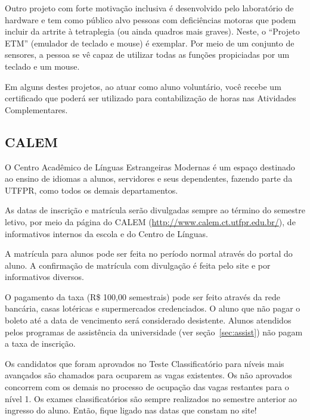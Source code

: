 \documentclass[a4paper,12pt,openany]{article}
\begin{document}
Outro projeto com forte motivação inclusiva é desenvolvido pelo laboratório de hardware e tem como público alvo pessoas com deficiências motoras que podem incluir da artrite à tetraplegia (ou ainda quadros mais graves). Neste, o ``Projeto ETM'' (emulador de teclado e mouse) é exemplar. Por meio de um conjunto de sensores, a pessoa se vê capaz de utilizar todas as funções propiciadas por um teclado e um mouse. 

Em alguns destes projetos, ao atuar como aluno voluntário, você recebe um certificado que poderá ser utilizado para contabilização de horas nas Atividades Complementares. %

\subsection{CALEM}

O Centro Acadêmico de Línguas Estrangeiras Modernas é um espaço destinado ao ensino de idiomas a alunos, servidores e seus dependentes,  fazendo parte da UTFPR, como todos os demais departamentos.

As datas de inscrição e matrícula serão divulgadas sempre ao término do semestre letivo, por meio da página do CALEM (\url{http://www.calem.ct.utfpr.edu.br/}), de informativos internos da escola e do Centro de Línguas.

A matrícula para alunos pode ser feita no período normal através do portal do aluno. A confirmação de matrícula com divulgação é feita pelo site e por informativos diversos.

O pagamento da taxa (R\$ 100,00 semestrais) pode ser feito através da rede bancária, casas lotéricas e supermercados credenciados. O aluno que não pagar o boleto até a data de vencimento será considerado desistente. Alunos atendidos pelos programas de assistência da universidade (ver seção~\ref{sec:assist}) não pagam a taxa de inscrição.

Os candidatos que foram aprovados no Teste Classificatório para níveis mais avançados são chamados para ocuparem as vagas existentes. Os não aprovados concorrem com os demais no processo de ocupação das vagas restantes para o nível 1. Os exames classificatórios são sempre realizados no semestre anterior ao ingresso do aluno. Então, fique ligado nas datas que constam no site!


\end{document}
